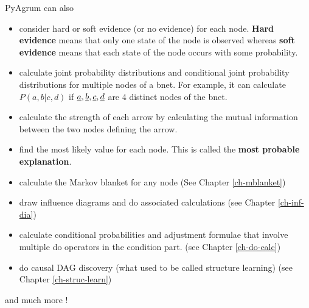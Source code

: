 PyAgrum can also  

\begin{itemize}

\item consider hard or soft evidence (or no evidence)
for each node. {\bf Hard evidence} means that only
one state of the node is observed whereas {\bf soft
evidence} means that each state of the node occurs with some probability.


\item calculate joint probability distributions and conditional joint probability distributions for multiple nodes of a bnet.
For example, it can calculate  $P(a,b|c,d)$ if ${\underline{a}}, {\underline{b}}, {\underline{c}}, {\underline{d}}$ 
are 4  distinct nodes of the bnet.

\item calculate the strength of each arrow by calculating 
the mutual information between the two nodes defining the arrow.

\item find
the most likely value for each node. This is called the {\bf most probable explanation}.

\item calculate the Markov blanket for any node (See Chapter \ref{ch-mblanket})

\item draw influence diagrams and do associated calculations (see Chapter \ref{ch-inf-dia})

\item calculate conditional probabilities and adjustment formulae  that involve multiple do operators in the condition part. (see Chapter \ref{ch-do-calc})
\item do causal DAG discovery (what used to be called structure learning) (see Chapter \ref{ch-struc-learn})

\end{itemize}
and much more !

